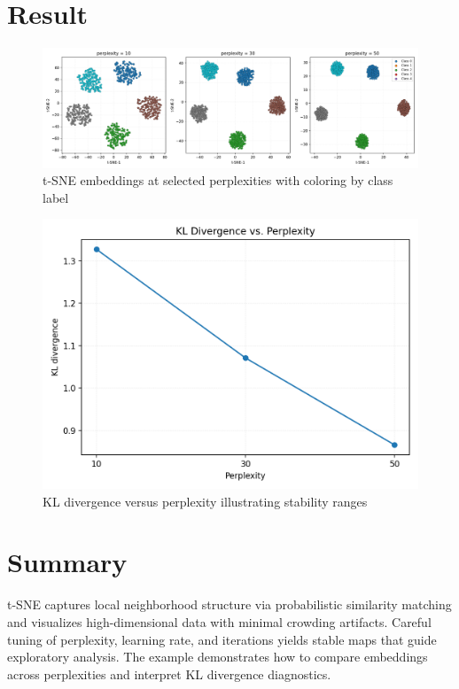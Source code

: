 ﻿\documentclass[12pt]{article}
\begin{document}
\section{Result}
\begin{figure}[H]
  \centering
  \includegraphics[width=0.82\linewidth]{tsne_embeddings.png}
  \caption{t-SNE embeddings at selected perplexities with coloring by class label}
  \label{fig:tsne_embeddings}
\end{figure}

\begin{figure}[H]
  \centering
  \includegraphics[width=0.8\linewidth]{tsne_perplexity_curve.png}
  \caption{KL divergence versus perplexity illustrating stability ranges}
  \label{fig:tsne_perplexity_curve}
\end{figure}

\FloatBarrier
\section{Summary}
t-SNE captures local neighborhood structure via probabilistic similarity matching and visualizes high-dimensional data with minimal crowding artifacts. Careful tuning of perplexity, learning rate, and iterations yields stable maps that guide exploratory analysis. The example demonstrates how to compare embeddings across perplexities and interpret KL divergence diagnostics.
\end{document}
